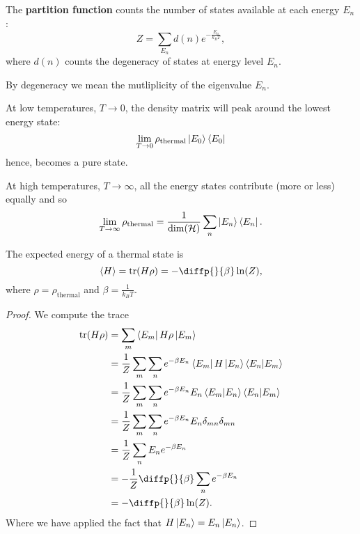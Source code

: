 \documentclass[12pt, a4paper]{article}
\begin{document}
\begin{definition}
    The \textbf{partition function} counts the number of states available at each energy \(E_n\): 
    \[Z= \sum_{E_n} d(n) e^{-\frac{E_n}{k_B T}},\]
    where \(d(n)\) counts the degeneracy of states at energy level \(E_n\).
\end{definition}

\begin{mdnote}
    By degeneracy we mean the mutliplicity of the eigenvalue \(E_n\).
\end{mdnote}

\begin{proposition}
    At low temperatures, \(T \to 0\), the density matrix will peak around the lowest energy state:
    \[\lim_{T\to 0} \rho_{\text{thermal}}\ket{E_0} \bra{E_0}\]
    hence, becomes a pure state.
\end{proposition}

\begin{proposition}
    At high temperatures, \(T \to \infty\), all the energy states contribute (more or less) equally and so 
    \[\lim_{T \to \infty} \rho_{\text{thermal}} = \frac{1}{\dim(\mathcal{H})} \sum_n \ket{E_n} \bra{E_n}.\]
\end{proposition}

\begin{mdthm}
    The expected energy of a thermal state is 
    \[\langle H \rangle = \text{tr}(H\rho) = -\diffp{}{\beta} \ln(Z),\]
    where \(\rho=\rho_\text{thermal}\) and \(\beta = \frac{1}{k_B T}\).
\end{mdthm}

\begin{proof}
    We compute the trace 
    \[\begin{aligned}
        \text{tr}(H\rho) &= \sum_m \bra{E_m} H\rho \ket{E_m} \\
        &= \frac{1}{Z} \sum_m\sum_n e^{-\beta E_n} \bra{E_m} H \ket{E_n}\bra{E_n} \ket{E_m} \\
        &= \frac{1}{Z} \sum_m\sum_n e^{-\beta E_n} E_n\bra{E_m}\ket{E_n}\bra{E_n} \ket{E_m} \\
        &=\frac{1}{Z} \sum_m\sum_n e^{-\beta E_n} E_n \delta_{mn}\delta_{mn} \\
        &=\frac{1}{Z} \sum_n E_n e^{-\beta E_n} \\
        &=- \frac{1}{Z} \diffp{}{\beta} \sum_n e^{-\beta E_n}\\
        &= - \diffp{}{\beta}\ln(Z).
    \end{aligned}\]
    Where we have applied the fact that \(H\ket{E_n} = E_n \ket{E_n}\).
\end{proof}
\end{document}
